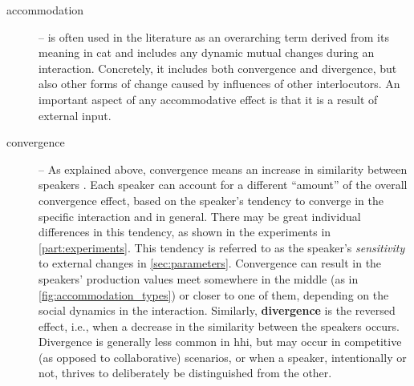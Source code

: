 \begin{description}
	\item[accommodation] -- is often used in the literature as an overarching term derived from its meaning in \ac{cat} and includes any dynamic mutual changes during an interaction.
	Concretely, it includes both convergence and divergence, but also other forms of change caused by influences of other interlocutors.
	An important aspect of any accommodative effect is that it is a result of external input.
	
	\item[convergence] -- As explained above, convergence means an increase in similarity between speakers \citep[see Figure 1 in][]{Levitan2011measuring}.
	Each speaker can account for a different \enquote{amount} of the overall convergence effect, based on the speaker's tendency to converge in the specific interaction and in general.
	There may be great individual differences in this tendency, as shown in the experiments in \cref{part:experiments}.
	This tendency is referred to as the speaker's \emph{sensitivity} to external changes in \cref{sec:parameters}.
	Convergence can result in the speakers' production values meet somewhere in the middle (as in \cref{fig:accommodation_types}) or closer to one of them, depending on the social dynamics in the interaction.
	Similarly, \textbf{divergence} is the reversed effect, i.e., when a decrease in the similarity between the speakers occurs.
	Divergence is generally less common in \ac{hhi}, but may occur in competitive (as opposed to collaborative) scenarios, or when a speaker, intentionally or not, thrives to deliberately be distinguished from the other.
	

\end{description}
